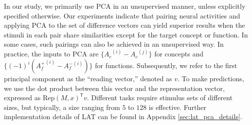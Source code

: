 In our study, we primarily use PCA in an unsupervised manner, unless explicitly specified otherwise. Our experiments indicate that pairing neural activities and applying PCA to the set of difference vectors can yield superior results when the stimuli in each pair share similarities except for the target concept or function. In some cases, such pairings can also be achieved in an unsupervised way. In practice, the inputs to PCA are $\{{A_c}^{(i)} - {A_c}^{(j)}\}$ for concepts and $\{(-1)^i({A_f^+}^{(i)} - {A_f^-}^{(i)})\}$ for functions. Subsequently, we refer to the first principal component as the ``reading vector,'' denoted as $v$. To make predictions, we use the dot product between this vector and the representation vector, expressed as $\text{Rep}(M, x)^\mathsf{T} v$. Different tasks require stimulus sets of different sizes, but typically, a size ranging from $5$ to $128$ is effective. Further implementation details of LAT can be found in Appendix \ref{sec:lat_pca_details}.







